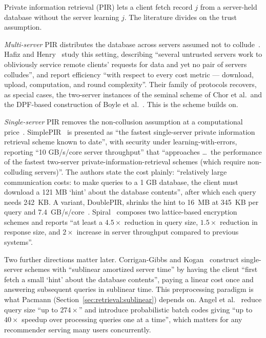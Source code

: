 Private information retrieval (PIR) lets a client fetch record $j$ from a server-held database
without the server learning $j$. The literature divides on the trust assumption.

\emph{Multi-server} PIR distributes the database across servers assumed not to
collude~\cite{chor1995}. Hafiz and Henry~\cite{hafiz2019} study this setting, describing ``several
untrusted servers work to obliviously service remote clients' requests for data and yet no pair of
servers colludes'', and report efficiency ``with respect to every cost metric --- download,
upload, computation, and round complexity''. Their family of protocols recovers, as special
cases, the two-server instances of the seminal scheme of Chor et al.\ and the DPF-based
construction of Boyle et al.~\cite{hafiz2019}. This is the scheme \pirsona{} builds on.

\emph{Single-server} PIR removes the non-collusion assumption at a computational
price~\cite{kushilevitz1997}. SimplePIR~\cite{simplepir2023} is presented as ``the fastest
single-server private information retrieval scheme known to date'', with security under
learning-with-errors, reporting ``10 GB/s/core server throughput'' that ``approaches \dots\ the
performance of the fastest two-server private-information-retrieval schemes (which require
non-colluding servers)''. The authors state the cost plainly: ``relatively large communication
costs: to make queries to a 1 GB database, the client must download a 121 MB `hint' about the
database contents'', after which each query needs 242~KB. A variant, DoublePIR, shrinks the hint
to 16~MB at 345~KB per query and 7.4~GB/s/core~\cite{simplepir2023}. Spiral~\cite{spiral2022}
composes two lattice-based encryption schemes and reports ``at least a $4.5\times$ reduction in
query size, $1.5\times$ reduction in response size, and $2\times$ increase in server throughput
compared to previous systems''.

Two further directions matter later. Corrigan-Gibbs and Kogan~\cite{cgk2020} construct
single-server schemes with ``sublinear amortized server time'' by having the client ``first fetch
a small `hint' about the database contents'', paying a linear cost once and answering subsequent
queries in sublinear time. This preprocessing paradigm is what Pacmann (Section~\ref{sec:retrieval:sublinear})
depends on. Angel et al.~\cite{sealpir2018} reduce query size ``up to $274\times$'' and introduce
probabilistic batch codes giving ``up to $40\times$ speedup over processing queries one at a
time'', which matters for any recommender serving many users concurrently.

